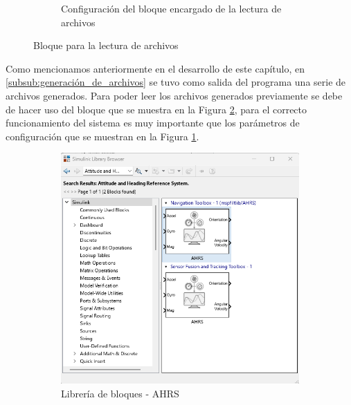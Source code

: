 \begin{figure}[htbp]
\begin{subfigure}[b]{0.45\textwidth}
        \caption{Configuración del bloque encargado de la lectura de archivos}
        \label{fig:config_from_file_IMU}
    \end{subfigure}
    \caption{Bloque para la lectura de archivos}
    \label{fig:read_from_file}
\end{figure}

Como mencionamos anteriormente en el desarrollo de este capítulo, en \ref{subsub:generación_de_archivos} se tuvo como salida del programa una serie de archivos generados. Para poder leer los archivos generados previamente se debe de hacer uso del bloque que se muestra en la Figura \ref{fig:read_from_file}, para el correcto funcionamiento del sistema es muy importante que los parámetros de configuración que se muestran en la Figura \ref{fig:config_from_file_IMU}.

\begin{figure}[htbp]
    \centering
    \begin{subfigure}[b]{0.35\textwidth}
        \centering
        \includegraphics[width=\textwidth]{fig/Capitulo5/Caso_de_estudio_IMU/Generador_de_salidas/libreira_de_bloques_sensor_AHRS.png}
        \caption{Librería de bloques - AHRS}
        \label{fig:lib_bloques_AHRS}
    \end{subfigure}
    \hfill
    \begin{subfigure}[b]{0.45\textwidth}

\end{subfigure}
\end{figure}
